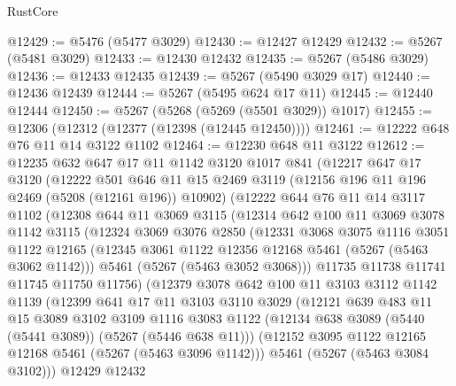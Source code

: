\begin{lexlean}{RustCore}
\begin{coremodule}
@12429 := @5476 (@5477 @3029)
@12430 := @12427 @12429
@12432 := @5267 (@5481 @3029)
@12433 := @12430 @12432
@12435 := @5267 (@5486 @3029)
@12436 := @12433 @12435
@12439 := @5267 (@5490 @3029 @17)
@12440 := @12436 @12439
@12444 := @5267 (@5495 @624 @17 @11)
@12445 := @12440 @12444
@12450 := @5267 (@5268 (@5269 (@5501 @3029)) @1017)
@12455 := @12306 (@12312 (@12377 (@12398 (@12445 @12450))))
@12461 := @12222 @648 @76 @11 @14 @3122 @1102
@12464 := @12230 @648 @11 @3122
@12612 := @12235
    @632
    @647
    @17
    @11
    @1142
    @3120
    @1017
    @841
    (@12217
      @647
      @17
      @3120
      (@12222
        @501
        @646
        @11
        @15
        @2469
        @3119
        (@12156 @196 @11 @196 @2469 (@5208 (@12161 @196)) @10902)
        (@12222
          @644
          @76
          @11
          @14
          @3117
          @1102
          (@12308
            @644
            @11
            @3069
            @3115
            (@12314
              @642
              @100
              @11
              @3069
              @3078
              @1142
              @3115
              (@12324
                @3069
                @3076
                @2850
                (@12331
                  @3068
                  @3075
                  @1116
                  @3051
                  @1122
                  @12165
                  (@12345 @3061 @1122 @12356 @12168 @5461 (@5267 (@5463 @3062 @1142)))
                  @5461
                  (@5267 (@5463 @3052 @3068)))
                @11735
                @11738
                @11741
                @11745
                @11750
                @11756)
              (@12379
                @3078
                @642
                @100
                @11
                @3103
                @3112
                @1142
                @1139
                (@12399
                  @641
                  @17
                  @11
                  @3103
                  @3110
                  @3029
                  (@12121
                    @639
                    @483
                    @11
                    @15
                    @3089
                    @3102
                    @3109
                    @1116
                    @3083
                    @1122
                    (@12134 @638 @3089 (@5440 (@5441 @3089)) (@5267 (@5446 @638 @11)))
                    (@12152 @3095 @1122 @12165 @12168 @5461 (@5267 (@5463 @3096 @1142)))
                    @5461
                    (@5267 (@5463 @3084 @3102)))
                  @12429
                  @12432

\end{coremodule}
\end{lexlean}
